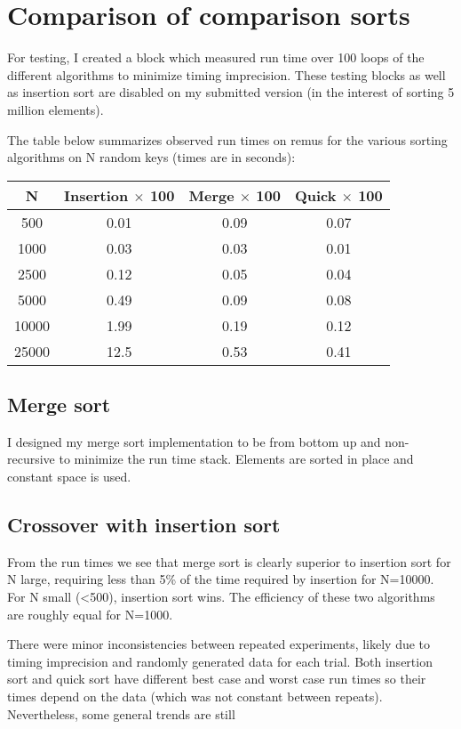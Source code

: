 \documentclass[12pt]{article}
\begin{document}
\section{Comparison of comparison sorts}

For testing, I created a block which measured run time over 100 loops
of the different algorithms to minimize timing imprecision. These
testing blocks as well as insertion sort are disabled on my submitted
version (in the interest of sorting 5 million elements).

The table below summarizes observed run times on remus for the various
sorting algorithms on N random keys (times are in seconds):

\begin{center}
  \begin{tabular}{c || c | c | c}
    N & Insertion $\times$ 100 & Merge  $\times$ 100 & Quick $\times$ 100\\
    \hline
    500 & 0.01 & 0.09 & 0.07\\
    1000 & 0.03 & 0.03 & 0.01\\
    2500 & 0.12 & 0.05 & 0.04\\
    5000 & 0.49 & 0.09 & 0.08\\
    10000 & 1.99 & 0.19 & 0.12\\
    25000 & 12.5 & 0.53 & 0.41
  \end{tabular}
\end{center}

\subsection{Merge sort}

I designed my merge sort implementation to be from bottom up and
non-recursive to minimize the run time stack. Elements are sorted in
place and constant space is used.

\subsection{Crossover with insertion sort}

From the run times we see that merge sort is clearly superior to
insertion sort for N large, requiring less than 5\% of the time
required by insertion for N=10000. For N small (<500), insertion sort
wins. The efficiency of these two algorithms are roughly equal for N=1000.

There were minor inconsistencies between repeated experiments, likely
due to timing imprecision and randomly generated data for each
trial. Both insertion sort and quick sort have different
best case and worst case run times so their times depend on the data
(which was not constant between repeats). Nevertheless, some general trends are still
\end{document}
